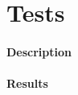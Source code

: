 \documentclass[a4paper,11pt]{article}
\begin{document}
\section{Tests}
\paragraph{Description}

\paragraph{Results}
\end{document}
